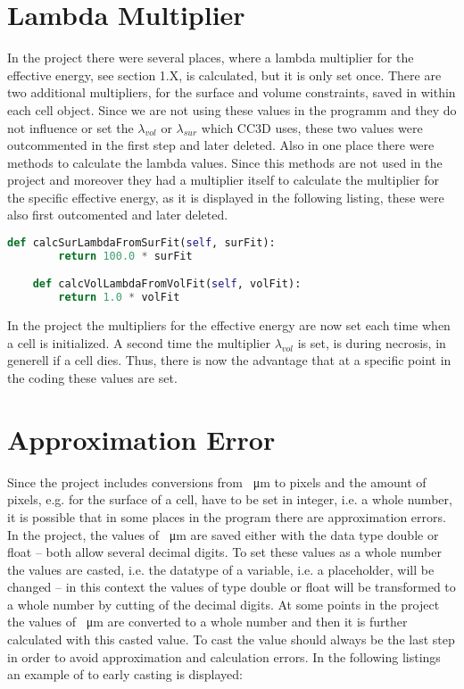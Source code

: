 \section{Lambda Multiplier}
In the project there were several places, where a lambda multiplier for the effective energy, see section 1.X, is calculated, but it is only set once. There are two additional multipliers, for the surface and volume constraints, saved in within each cell object. Since we are not using these values in the programm and they do not influence or set the $\lambda_{vol}$ or $\lambda_{sur}$ which \ac{CC3D} uses, these two values were outcommented in the first step and later deleted. \newline 
Also in one place there were methods to calculate the lambda values. Since this methods are not used in the project and moreover they had a multiplier itself to calculate the multiplier for the specific effective energy, as it is displayed in the following listing, these were also first outcomented and later deleted.
\begin{lstlisting}[language=Python, caption= methods to calculate the $\lambda_{vol}$ and $\lambda_{sur}$ for the effective energy]
    def calcSurLambdaFromSurFit(self, surFit):
        return 100.0 * surFit

    def calcVolLambdaFromVolFit(self, volFit):
        return 1.0 * volFit
\end{lstlisting}

In the project the multipliers for the effective energy are now set each time when a cell is initialized. A second time the multiplier $\lambda_{vol}$ is set, is during necrosis, in generell if a cell dies. Thus, there is now the advantage that at a specific point in the coding these values are set.




\section{Approximation Error}
Since the project includes conversions from \SI{}{\micro\metre} to pixels and the amount of pixels, e.g. for the surface of a cell, have to be set in integer, i.e. a whole number, it is possible that in some places in the program there are approximation errors. In the project, the values of \SI{}{\micro\metre} are saved either with the data type double or float -- both allow several decimal digits. To set these values as a whole number the values are casted, i.e. the datatype of a variable, i.e. a placeholder, will be changed -- in this context the values of type double or float will be transformed to a whole number by cutting of the decimal digits. At some points in the project the values of \SI{}{\micro\metre} are converted to a whole number and then it is further calculated with this casted value. To cast the value should always be the last step in order to avoid approximation and calculation errors. In the following listings an example of to early casting is displayed:

